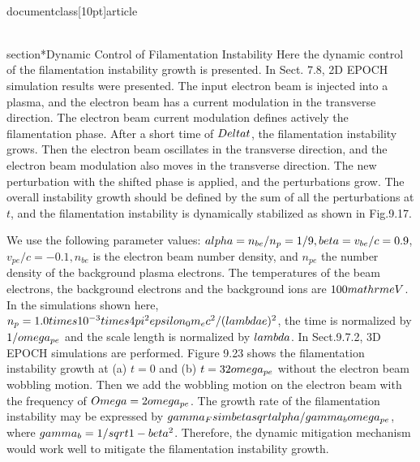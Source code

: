 \\documentclass[10pt]{article}
\begin{document}
{{{{{{\\section*{Dynamic Control of Filamentation Instability}
Here the dynamic control of the filamentation instability growth is presented. In Sect. 7.8, 2D EPOCH simulation results were presented. The input electron beam is injected into a plasma, and the electron beam has a current modulation in the transverse direction. The electron beam current modulation defines actively the filamentation phase. After a short time of $\\Delta t$, the filamentation instability grows. Then the electron beam oscillates in the transverse direction, and the electron beam modulation also moves in the transverse direction. The new perturbation with the shifted phase is applied, and the perturbations grow. The overall instability growth should be defined by the sum of all the perturbations at $t$, and the filamentation instability is dynamically stabilized as shown in Fig.9.17.

We use the following parameter values: $\\alpha=n_{b e} / n_{p}=1 / 9, \\beta=v_{b e} / c=0.9$, $v_{p e} / c=-0.1, n_{b e}$ is the electron beam number density, and $n_{p e}$ the number density of the background plasma electrons. The temperatures of the beam electrons, the background electrons and the background ions are $100 \\mathrm{eV}$. In the simulations shown here, $n_{p}=1.0 \\times 10^{-3} \\times 4 \\pi^{2} \\epsilon_{0} m_{e} c^{2} /(\\lambda e)^{2}$, the time is normalized by $1 / \\omega_{p e}$ and the scale length is normalized by $\\lambda$. In Sect.9.7.2, 3D EPOCH simulations are performed. Figure 9.23 shows the filamentation instability growth at (a) $t=0$ and (b) $t=32 \\omega_{p e}$ without the electron beam wobbling motion. Then we add the wobbling motion on the electron beam with the frequency of $\\Omega=2 \\omega_{p e}$. The growth rate of the filamentation instability may be expressed by $\\gamma_{F} \\sim \\beta \\sqrt{\\alpha / \\gamma_{b}} \\omega_{p e}$, where $\\gamma_{b}=1 / \\sqrt{1-\\beta^{2}}$. Therefore, the dynamic mitigation mechanism would work well to mitigate the filamentation instability growth.

}}}}}}
\end{document}
